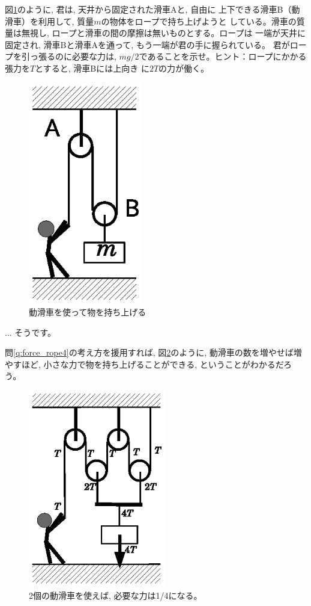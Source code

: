 %
\begin{q}\label{q:force_rope4}
図\ref{fig:string4}のように, 君は, 天井から固定された滑車Aと, 自由に
上下できる滑車B（動滑車）を利用して, 質量$m$の物体をロープで持ち上げようと
している。滑車の質量は無視し, ロープと滑車の間の摩擦は無いものとする。ロープは
一端が天井に固定され, 滑車Bと滑車Aを通って, もう一端が君の手に握られている。
君がロープを引っ張るのに必要な力は, 
$mg/2$であることを示せ。ヒント：ロープにかかる張力を$T$とすると, 滑車Bには上向き
に$2T$の力が働く。
\begin{figure}[h]
    \centering
    \includegraphics[width=5cm]{string4.eps}
    \caption{動滑車を使って物を持ち上げる}\label{fig:string4}
\end{figure}
\end{q}

\begin{faq}{\small{}
... そうです。}\end{faq}\mv


問\ref{q:force_rope4}の考え方を援用すれば, 図\ref{fig:string4_iketeru}のように, 
動滑車の数を増やせば増やすほど, 小さな力で物を持ち上げることができる, ということがわかるだろう。
\begin{figure}[h]
    \centering
    \includegraphics[width=6cm]{string4_iketeru.eps}
    \caption{2個の動滑車を使えば, 必要な力は1/4になる。}\label{fig:string4_iketeru}
\end{figure}

